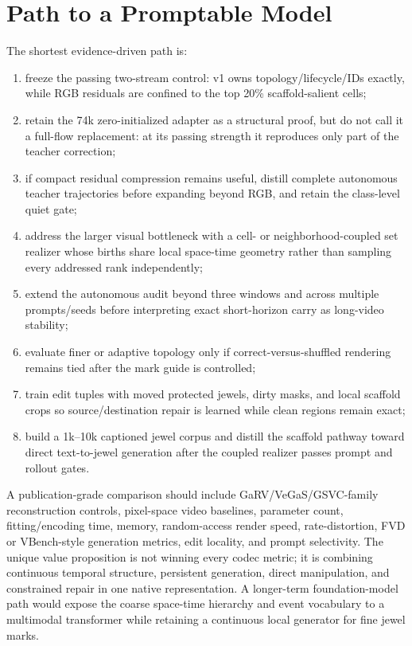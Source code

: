 \documentclass[10pt]{article}
\begin{document}
\section{Path to a Promptable Model}

The shortest evidence-driven path is:

\begin{enumerate}
  \item freeze the passing two-stream control: v1 owns topology/lifecycle/IDs exactly, while RGB
  residuals are confined to the top 20\% scaffold-salient cells;
  \item retain the 74k zero-initialized adapter as a structural proof, but do not call it a full-flow
  replacement: at its passing strength it reproduces only part of the teacher correction;
  \item if compact residual compression remains useful, distill complete autonomous teacher
  trajectories before expanding beyond RGB, and retain the class-level quiet gate;
  \item address the larger visual bottleneck with a cell- or neighborhood-coupled set realizer whose
  births share local space-time geometry rather than sampling every addressed rank independently;
  \item extend the autonomous audit beyond three windows and across multiple prompts/seeds before
  interpreting exact short-horizon carry as long-video stability;
  \item evaluate finer or adaptive topology only if correct-versus-shuffled rendering remains tied
  after the mark guide is controlled;
  \item train edit tuples with moved protected jewels, dirty masks, and local scaffold crops so
  source/destination repair is learned while clean regions remain exact;
  \item build a 1k--10k captioned jewel corpus and distill the scaffold pathway toward direct
  text-to-jewel generation after the coupled realizer passes prompt and rollout gates.
\end{enumerate}

A publication-grade comparison should include GaRV/VeGaS/GSVC-family reconstruction controls,
pixel-space video baselines, parameter count, fitting/encoding time, memory, random-access render
speed, rate-distortion, FVD or VBench-style generation metrics, edit locality, and prompt
selectivity. The unique value proposition is not winning every codec metric; it is combining
continuous temporal structure, persistent generation, direct manipulation, and constrained repair
in one native representation. A longer-term foundation-model path would expose the coarse
space-time hierarchy and event vocabulary to a multimodal transformer while retaining a continuous
local generator for fine jewel marks.
\end{document}
